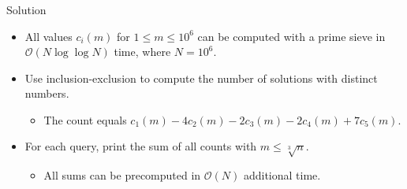 \begin{frame}
    \frametitle{\problemtitle}
    \begin{block}{Solution}
        \begin{itemize}
        \item<+-> All values $c_i(m)$ for $1 \leq m \leq 10^6$ can be computed with a prime sieve in $\mathcal{O}(N \log \log N)$ time, where $N = 10^6$.
        \item<+-> Use inclusion-exclusion to compute the number of solutions with distinct numbers.
            \begin{itemize}
            \item The count equals $c_1(m) - 4c_2(m) - 2c_3(m) - 2c_4(m) + 7c_5(m)$.
            \end{itemize}
        \item<+-> For each query, print the sum of all counts with $m \leq \sqrt[3]{n}$.
        	\begin{itemize}
        	\item<+-> All sums can be precomputed in $\mathcal{O}(N)$ additional time.
        	\end{itemize}
        \end{itemize}
    \end{block}
\end{frame}
